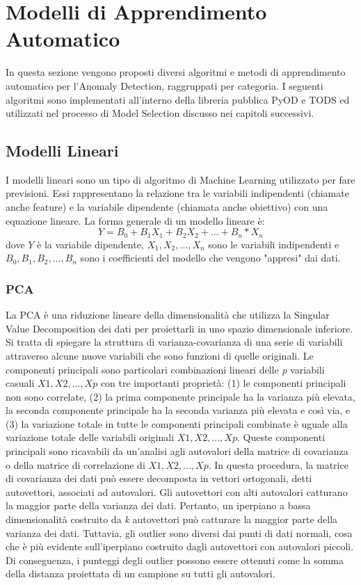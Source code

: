 \section{Modelli di Apprendimento Automatico}
In questa sezione vengono proposti diversi algoritmi e metodi di apprendimento automatico per l'Anomaly Detection, raggruppati per categoria.
I seguenti algoritmi sono implementati all'interno della libreria pubblica PyOD e TODS ed utilizzati nel processo di Model Selection discusso nei capitoli successivi.

\subsection{Modelli Lineari}
I modelli lineari sono un tipo di algoritmo di Machine Learning utilizzato per fare previsioni. Essi rappresentano la relazione tra le variabili indipendenti (chiamate anche feature) e la variabile dipendente (chiamata anche obiettivo) con una equazione lineare. La forma generale di un modello lineare è: 
\[ Y = B_0 + B_1X_1 + B_2X_2 + ... + B_n*X_n\]
dove $ Y $ è la variabile dipendente,  \(X_1, X_2, ..., X_n\)  sono le variabili indipendenti e \( B_0, B_1, B_2, ..., B_n\) sono i coefficienti del modello che vengono "appresi" dai dati.

\subsubsection{PCA}
La PCA è una riduzione lineare della dimensionalità che utilizza la Singular Value Decomposition dei dati per proiettarli in uno spazio dimensionale inferiore. Si tratta di spiegare la struttura di varianza-covarianza di una serie di variabili attraverso alcune nuove variabili che sono funzioni di quelle originali. Le componenti principali sono particolari combinazioni lineari delle \textit{p} variabili casuali  \(X1, X2, ..., Xp\) con tre importanti proprietà: (1) le componenti principali non sono correlate, (2) la prima componente principale ha la varianza più elevata, la seconda componente principale ha la seconda varianza più elevata e così via, e (3) la variazione totale in tutte le componenti principali combinate è uguale alla variazione totale delle variabili originali \(X1, X2, ..., Xp\). 
Queste componenti principali sono ricavabili da un'analisi agli autovalori della matrice di covarianza o della matrice di correlazione di \(X1, X2, ..., Xp\).
In questa procedura, la matrice di covarianza dei dati può essere decomposta in vettori ortogonali, detti autovettori, associati ad autovalori. Gli autovettori con alti autovalori catturano la maggior parte della varianza dei dati. Pertanto, un iperpiano a bassa dimensionalità costruito da \textit{k} autovettori può catturare la maggior parte della varianza dei dati. Tuttavia, gli outlier sono diversi dai punti di dati normali, cosa che è più evidente sull'iperpiano costruito dagli autovettori con autovalori piccoli.
Di conseguenza, i punteggi degli outlier possono essere ottenuti come la somma della distanza proiettata di un campione su tutti gli autovalori.


